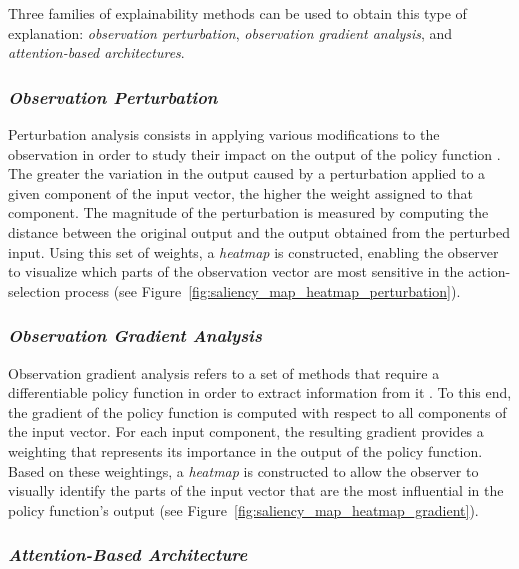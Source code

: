 Three families of explainability methods can be used to obtain this type of explanation: \textit{observation perturbation}, \textit{observation gradient analysis}, and \textit{attention-based architectures}.

\subsubsection{\textit{Observation Perturbation}}
\label{subsubsec:observation_perturbation}

Perturbation analysis consists in applying various modifications to the observation in order to study their impact on the output of the policy function \parencite{greydanus2018visualizing}.
The greater the variation in the output caused by a perturbation applied to a given component of the input vector, the higher the weight assigned to that component.
The magnitude of the perturbation is measured by computing the distance between the original output and the output obtained from the perturbed input.
Using this set of weights, a \textit{heatmap} is constructed, enabling the observer to visualize which parts of the observation vector are most sensitive in the action-selection process (see Figure~\ref{fig:saliency_map_heatmap_perturbation}).

\subsubsection{\textit{Observation Gradient Analysis}}
\label{subsubsec:observation_gradient_analysis}

Observation gradient analysis refers to a set of methods that require a differentiable policy function in order to extract information from it \parencite{simonyan2014deep, weitkamp2019visual, huber2019enhancing}.
To this end, the gradient of the policy function is computed with respect to all components of the input vector.
For each input component, the resulting gradient provides a weighting that represents its importance in the output of the policy function.
Based on these weightings, a \textit{heatmap} is constructed to allow the observer to visually identify the parts of the input vector that are the most influential in the policy function's output (see Figure~\ref{fig:saliency_map_heatmap_gradient}).

\subsubsection{\textit{Attention-Based Architecture}}
\label{subsubsec:attention_based_architecture}

